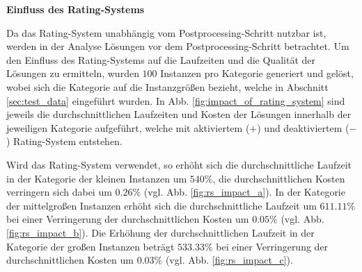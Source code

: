 \textbf{Einfluss des Rating-Systems}

Da das Rating-System unabhängig vom Postprocessing-Schritt nutzbar ist, werden in der Analyse Lösungen vor dem Postprocessing-Schritt betrachtet. Um den Einfluss des Rating-Systems auf die Laufzeiten und die Qualität der
Lösungen zu ermitteln, wurden $100$ Instanzen pro Kategorie generiert und gelöst, wobei sich die Kategorie
auf die Instanzgrößen bezieht, welche in Abschnitt \ref{sec:test_data} eingeführt wurden.
In Abb. \ref{fig:impact_of_rating_system} sind jeweils die durchschnittlichen Laufzeiten und Kosten der Lösungen
innerhalb der jeweiligen Kategorie aufgeführt, welche mit aktiviertem ($+$) und deaktiviertem ($-$)
Rating-System entstehen.

Wird das Rating-System verwendet, so erhöht sich die durchschnittliche Laufzeit in der Kategorie der kleinen Instanzen
um $540 \%$, die durchschnittlichen Kosten verringern sich dabei um $0.26 \%$ (vgl. Abb. \ref{fig:rs_impact_a}).
In der Kategorie der mittelgroßen Instanzen erhöht sich die durchschnittliche Laufzeit um $611.11 \%$ bei einer
Verringerung der durchschnittlichen Kosten um $0.05 \%$ (vgl. Abb. \ref{fig:rs_impact_b}).
Die Erhöhung der durchschnittlichen Laufzeit in der Kategorie der großen Instanzen beträgt $533.33 \%$
bei einer Verringerung der durchschnittlichen Kosten um $0.03 \%$ (vgl. Abb. \ref{fig:rs_impact_c}).

